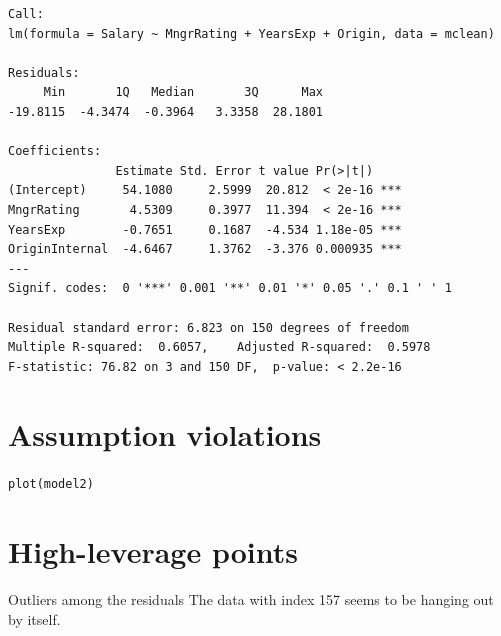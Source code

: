 \documentclass{beamer}\usepackage[]{graphicx}\usepackage[]{color}
\makeatletter
\newcommand{\hlstd}[1]{\textcolor[rgb]{1,0.894,0.769}{#1}}%
\newcommand{\hlkwd}[1]{\textcolor[rgb]{1,0.78,0.769}{#1}}%
\newenvironment{kframe}{%
 \def\at@end@of@kframe{}%
 \ifinner\ifhmode%
  \def\at@end@of@kframe{\end{minipage}}%
  \begin{minipage}{\columnwidth}%
 \fi\fi%
 \def\FrameCommand##1{\hskip\@totalleftmargin \hskip-\fboxsep
 \colorbox{shadecolor}{##1}\hskip-\fboxsep
     \hskip-\linewidth \hskip-\@totalleftmargin \hskip\columnwidth}%
 \MakeFramed {\advance\hsize-\width
   \@totalleftmargin\z@ \linewidth\hsize
   \@setminipage}}%
 {\par\unskip\endMakeFramed%
 \at@end@of@kframe}
\newenvironment{knitrout}{}{} %
\makeatother
\begin{document}
\begin{darkframes}
\begin{frame}[fragile]
\begin{knitrout}
\begin{kframe}
\begin{verbatim}
Call:
lm(formula = Salary ~ MngrRating + YearsExp + Origin, data = mclean)

Residuals:
     Min       1Q   Median       3Q      Max 
-19.8115  -4.3474  -0.3964   3.3358  28.1801 

Coefficients:
               Estimate Std. Error t value Pr(>|t|)    
(Intercept)     54.1080     2.5999  20.812  < 2e-16 ***
MngrRating       4.5309     0.3977  11.394  < 2e-16 ***
YearsExp        -0.7651     0.1687  -4.534 1.18e-05 ***
OriginInternal  -4.6467     1.3762  -3.376 0.000935 ***
---
Signif. codes:  0 '***' 0.001 '**' 0.01 '*' 0.05 '.' 0.1 ' ' 1

Residual standard error: 6.823 on 150 degrees of freedom
Multiple R-squared:  0.6057,	Adjusted R-squared:  0.5978 
F-statistic: 76.82 on 3 and 150 DF,  p-value: < 2.2e-16
\end{verbatim}
\end{kframe}
\end{knitrout}

      \lc
    \end{frame}
    
    \section{Assumption violations}
    
    \begin{frame}[fragile]
      \fontsize{9}{9}\selectfont

\begin{knitrout}
\begin{kframe}
\begin{alltt}
\hlkwd{plot}\hlstd{(model2)}
\end{alltt}
\end{kframe}


\end{knitrout}

    \end{frame}
    
    \section{High-leverage points}
    
    \begin{frame}[fragile]{Outliers among the residuals}  
      The data with index 157 seems to be hanging out by itself. \pause \bigskip
      

\end{frame}
\end{darkframes}
\end{document}
